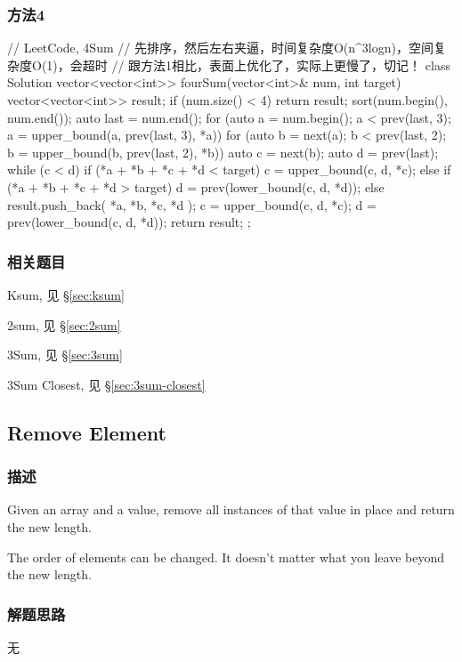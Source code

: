 \subsubsection{方法4}
\begin{Code}
	// LeetCode, 4Sum
	// 先排序，然后左右夹逼，时间复杂度O(n^3logn)，空间复杂度O(1)，会超时
	// 跟方法1相比，表面上优化了，实际上更慢了，切记！
	class Solution {
		vector<vector<int>> fourSum(vector<int>& num, int target) {
			vector<vector<int>> result;
			if (num.size() < 4) return result;
			sort(num.begin(), num.end());
			auto last = num.end();
			for (auto a = num.begin(); a < prev(last, 3);
			a = upper_bound(a, prev(last, 3), *a)) {
				for (auto b = next(a); b < prev(last, 2);
				b = upper_bound(b, prev(last, 2), *b)) {
					auto c = next(b);
					auto d = prev(last);
					while (c < d) {
						if (*a + *b + *c + *d < target) {
							c = upper_bound(c, d, *c);
						} else if (*a + *b + *c + *d > target) {
							d = prev(lower_bound(c, d, *d));
						} else {
							result.push_back({ *a, *b, *c, *d });
							c = upper_bound(c, d, *c);
							d = prev(lower_bound(c, d, *d));
						}
					}
				}
			}
			return result;
		}
	};
\end{Code}


\subsubsection{相关题目}
\begindot
\item Ksum, 见 \S \ref{sec:ksum}
\item 2sum, 见 \S \ref{sec:2sum}
\item 3Sum, 见 \S \ref{sec:3sum}
\item 3Sum Closest, 见 \S \ref{sec:3sum-closest}
\myenddot


\subsection{Remove Element} %
\label{sec:remove-element }


\subsubsection{描述}
Given an array and a value, remove all instances of that value in place and 
return the new length.

The order of elements can be changed. It doesn't matter what you leave beyond 
the new length.


\subsubsection{解题思路}
无


